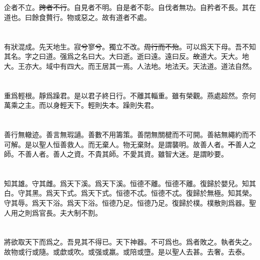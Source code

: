 \documentclass[a5paper]{ctexbook}
\newcommand{\bo}[1]{\textcolor[RGB]{0,255,255}{#1}}
\newcommand{\jian}[1]{\textcolor[RGB]{0,255,0}{#1}}
\def\del{\sout}
\begin{document}
    \chapter{}

    企者不立。\bo{\del{跨者不行}}。自見者不明。自是者不彰。自伐者無功。自矜者不長。其在道也。曰餘食贅行。物或惡之。故有道者不處。

    \chapter{}

    有\jian{狀}混成。先天地生。寂\jian{\del{兮}}寥\jian{\del{兮}}。獨立不改。\jian{\del{周行而不殆}}。可以爲天下母。吾不知其名。字之曰道。强爲之名曰大。大曰逝。逝曰遠。遠曰反。\jian{\del{故}}道大。天大。地大。王亦大。域中有四大。而王居其一焉。人法地。地法天。天法道。道法自然。

    \chapter{}

    重爲輕根。靜爲躁君。是以\bo{君子}終日行。不離其輜重。雖有榮觀。燕處超然。奈何萬乘之主。而以身輕天下。輕則失本。躁則失君。

    \chapter{}

    善行無轍迹。善言無瑕讁。善數不用籌策。善閉無關楗而不可開。善結無繩約而不可解。是以聖人\bo{恒}善救人。而无棄人。\bo{物无棄財}。是謂襲明。故善人者。\bo{\del{不}}善人之師。不善人者。善人之資。不貴其師。不愛其資。雖智大迷。是謂\bo{眇要}。

    \chapter{}

    知其雄。守其雌。爲天下\bo{溪}。爲天下\bo{溪}。\bo{恒}德不離。\bo{恒德不離}。復歸於嬰兒。知其白。守其黑。爲天下式。爲天下式。\bo{恒}德不忒。\bo{恒德不忒}。復歸於無極。知其榮。守其辱。爲天下\bo{浴}。爲天下\bo{浴}。\bo{恒}德乃足。\bo{恒德乃足}。復歸於樸。樸散則爲器。聖人用之則爲官長。\bo{夫}大制不割。

    \chapter{}

    將欲取天下而爲之。吾見其不得已。天下神器。不可爲也。爲者敗之。執者失之。故物或行或隨。或歔或吹。或强或羸。或\bo{陪}或\bo{墮}。是以聖人去甚。去奢。去泰。
\end{document}
